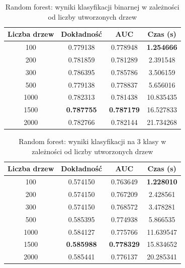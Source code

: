\documentclass[a4paper, twoside, 11pt, openright]{article}
\begin{document}
\begin{table}[H]
    \centering
    \begin{tabular}{|c|c|c|c|}
    \hline
        \textbf{Liczba drzew} & \textbf{Dokładność} & \textbf{AUC} & \textbf{Czas (s)} \\ \hline
100        &  0.779138 &  0.778948 &    \textbf{1.254666} \\ \hline
200        &  0.781859 &  0.781289 &    2.391548 \\ \hline
300        &  0.786395 &  0.785786 &    3.506159 \\ \hline
500       &  0.779138 &  0.778837 &    5.656016 \\ \hline
1000       &  0.782313 &  0.781438 &   10.835435 \\ \hline
1500      &  \textbf{0.787755} &  \textbf{0.787179} &   16.527833 \\ \hline
2000       &  0.782766 &  0.782144 &   21.734268 \\ \hline
    \end{tabular}
    \caption{Random forest: wyniki klasyfikacji binarnej w zależności od liczby utworzonych drzew}
    \label{tab:rf_estimators_binary}
\end{table}
\begin{table}[H]
    \centering
    \begin{tabular}{|c|c|c|c|}
    \hline
        \textbf{Liczba drzew} & \textbf{Dokładność} & \textbf{AUC} & \textbf{Czas (s)} \\ \hline
100        &  0.574150 &  0.763649 &    \textbf{1.228010} \\ \hline
200        &  0.574150 &  0.767209 &    2.428561 \\ \hline
300        &  0.574150 &  0.768572 &    3.478281 \\ \hline
500        &  0.585395 &  0.774938 &    5.866535 \\ \hline
1000       &  0.584127 &  0.775766 &   11.639547 \\ \hline
1500       &  \textbf{0.585988} &  \textbf{0.778329} &   15.834652 \\ \hline
2000      &  0.585441 &  0.776137 &   20.285341 \\ \hline
    \end{tabular}
    \caption{Random forest: wyniki klasyfikacji na 3 klasy w zależności od liczby utworzonych drzew}
    \label{tab:rf_estimators_discrete}
\end{table}
\end{document}
